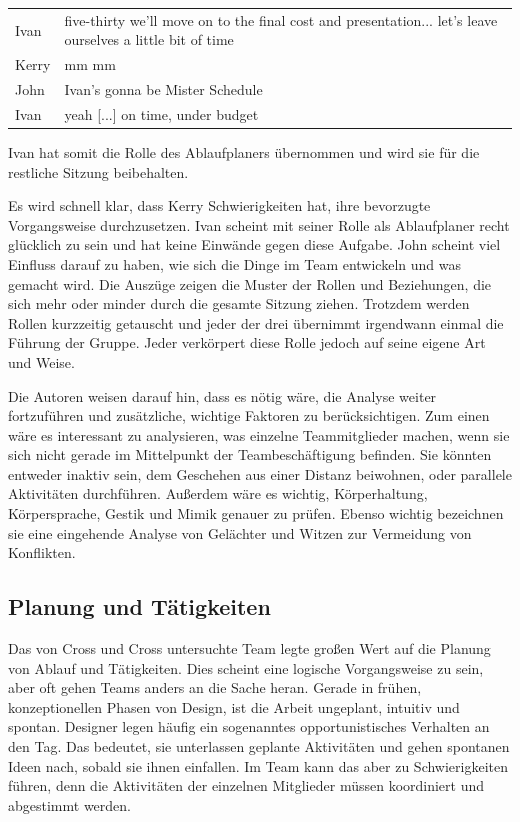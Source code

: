 \begin{extract}[John bestätigt Ivan erneut in seiner Rolle.]
	{
		\myfloatalign
		\begin{tabularx}{\textwidth}{p{1cm}X}
    		Ivan & five-thirty we'll move on to the final cost and presentation... let's leave ourselves a little bit of time \\
			Kerry & mm mm \\
			John & Ivan's gonna be Mister Schedule \\
			Ivan & yeah [...] on time, under budget
		\end{tabularx}
	}
\end{extract}

Ivan hat somit die Rolle des Ablaufplaners übernommen und wird sie für die restliche Sitzung beibehalten.

\medskip Es wird schnell klar, dass Kerry Schwierigkeiten hat, ihre bevorzugte Vorgangsweise durchzusetzen. Ivan scheint mit seiner Rolle als Ablaufplaner recht glücklich zu sein und hat keine Einwände gegen diese Aufgabe. John scheint viel Einfluss darauf zu haben, wie sich die Dinge im Team entwickeln und was gemacht wird. Die Auszüge zeigen die Muster der Rollen und Beziehungen, die sich mehr oder minder durch die gesamte Sitzung ziehen. Trotzdem werden Rollen kurzzeitig getauscht und jeder der drei übernimmt irgendwann einmal die Führung der Gruppe. Jeder verkörpert diese Rolle jedoch auf seine eigene Art und Weise.

Die Autoren weisen darauf hin, dass es nötig wäre, die Analyse weiter fortzuführen und zusätzliche, wichtige Faktoren zu berücksichtigen. Zum einen wäre es interessant zu analysieren, was einzelne Teammitglieder machen, wenn sie sich nicht gerade im Mittelpunkt der Teambeschäftigung befinden. Sie könnten entweder inaktiv sein, dem Geschehen aus einer Distanz beiwohnen, oder parallele Aktivitäten durchführen. Außerdem wäre es wichtig, Körperhaltung, Körpersprache, Gestik und Mimik genauer zu prüfen. Ebenso wichtig bezeichnen sie eine eingehende Analyse von Gelächter und Witzen zur Vermeidung von Konflikten.

\subsection{Planung und Tätigkeiten}\label{sec:collabActions} 

Das von Cross und Cross untersuchte Team legte großen Wert auf die Planung von Ablauf und Tätigkeiten. Dies scheint eine logische Vorgangsweise zu sein, aber oft gehen Teams anders an die Sache heran. Gerade in frühen, konzeptionellen Phasen von Design, ist die Arbeit ungeplant, intuitiv und spontan. Designer legen häufig ein sogenanntes opportunistisches Verhalten an den Tag. Das bedeutet, sie unterlassen geplante Aktivitäten und gehen spontanen Ideen nach, sobald sie ihnen einfallen. Im Team kann das aber zu Schwierigkeiten führen, denn die Aktivitäten der einzelnen Mitglieder müssen koordiniert und abgestimmt werden. 

